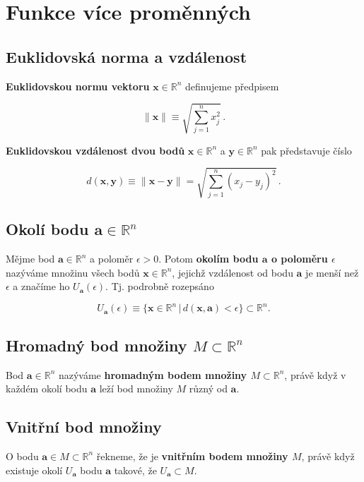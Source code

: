 \section{Funkce více proměnných}

\subsection*{Euklidovská norma a vzdálenost}

\textbf{Euklidovskou normu vektoru} $\mathbf{x} \in \mathbb{R}^n$ definujeme předpisem

\[ \| \mathbf{x} \| \equiv \sqrt{\sum_{j=1}^n x_j^2}\,. \]

\noindent \textbf{Euklidovskou vzdálenost dvou bodů} $\mathbf{x} \in \mathbb{R}^n$ a $\mathbf{y} \in \mathbb{R}^n$ pak představuje číslo

\[ d(\mathbf{x}, \mathbf{y}) \equiv \|\mathbf{x} - \mathbf{y}\| = \sqrt{\sum_{j=1}^n (x_j - y_j)^2}\,. \]

\subsection*{Okolí bodu $\mathbf{a} \in \mathbb{R}^n$}

Mějme bod $\mathbf{a} \in \mathbb{R}^n$ a poloměr $\epsilon > 0$. Potom
\textbf{okolím bodu $\mathbf{a}$ o poloměru $\epsilon$} nazýváme množinu všech
bodů $\mathbf{x} \in \mathbb{R}^n$, jejichž vzdálenost od bodu $\mathbf{a}$ je
menší než $\epsilon$ a značíme ho $U_\mathbf{a}(\epsilon)$. Tj. podrobně
rozepsáno

\[ U_\mathbf{a}(\epsilon) \equiv \big\{ \mathbf{x} \in \mathbb{R}^n \,\big|\, d(\mathbf{x}, \mathbf{a}) < \epsilon \big\} \subset \mathbb{R}^n. \]

\subsection*{Hromadný bod množiny $M \subset \mathbb{R}^n$}

Bod $\mathbf{a} \in \mathbb{R}^n$ nazýváme \textbf{hromadným bodem množiny $M
        \subset \mathbb{R}^n$}, právě když v každém okolí bodu $\mathbf{a}$ leží bod
množiny $M$ různý od $\mathbf{a}$.

\subsection*{Vnitřní bod množiny}

O bodu $\mathbf{a} \in M \subset \mathbb{R}^n$ řekneme, že je \textbf{vnitřním
    bodem množiny $M$}, právě když existuje okolí $U_{\mathbf{a}}$ bodu
$\mathbf{a}$ takové, že $U_{\mathbf{a}} \subset M$.

